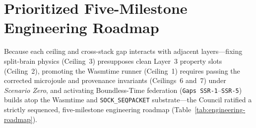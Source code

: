 \section{Prioritized Five-Milestone Engineering Roadmap}
\label{sec:next-sprint-roadmap}

Because each ceiling and cross-stack gap interacts with adjacent layers---fixing split-brain physics (Ceiling~3) presupposes clean Layer~3 property slots (Ceiling~2), promoting the Wasmtime runner (Ceiling~1) requires passing the corrected microjoule and provenance invariants (Ceilings~6 and~7) under \emph{Scenario Zero}, and activating Boundless-Time federation (\texttt{Gaps SSR-1}--\texttt{SSR-5}) builds atop the Wasmtime and \texttt{SOCK\_SEQPACKET} substrate---the Council ratified a strictly sequenced, five-milestone engineering roadmap (Table~\ref{tab:engineering-roadmap}).

